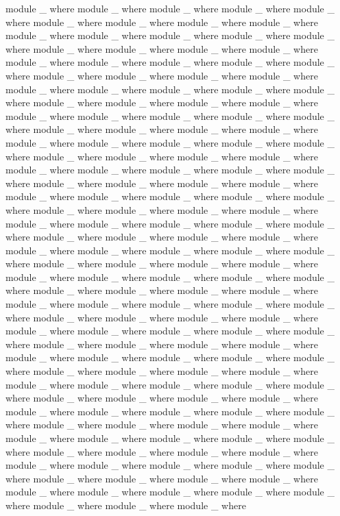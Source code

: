 \documentclass{article}
\begin{document}
\begin{code}
module _ where
module _ where
module _ where
module _ where
module _ where
module _ where
module _ where
module _ where
module _ where
module _ where
module _ where
module _ where
module _ where
module _ where
module _ where
module _ where
module _ where
module _ where
module _ where
module _ where
module _ where
module _ where
module _ where
module _ where
module _ where
module _ where
module _ where
module _ where
module _ where
module _ where
module _ where
module _ where
module _ where
module _ where
module _ where
module _ where
module _ where
module _ where
module _ where
module _ where
module _ where
module _ where
module _ where
module _ where
module _ where
module _ where
module _ where
module _ where
module _ where
module _ where
module _ where
module _ where
module _ where
module _ where
module _ where
module _ where
module _ where
module _ where
module _ where
module _ where
module _ where
module _ where
module _ where
module _ where
module _ where
module _ where
module _ where
module _ where
module _ where
module _ where
module _ where
module _ where
module _ where
module _ where
module _ where
module _ where
module _ where
module _ where
module _ where
module _ where
module _ where
module _ where
module _ where
module _ where
module _ where
module _ where
module _ where
module _ where
module _ where
module _ where
module _ where
module _ where
module _ where
module _ where
module _ where
module _ where
module _ where
module _ where
module _ where
module _ where
module _ where
module _ where
module _ where
module _ where
module _ where
module _ where
module _ where
module _ where
module _ where
module _ where
module _ where
module _ where
module _ where
module _ where
module _ where
module _ where
module _ where
module _ where
module _ where
module _ where
module _ where
module _ where
module _ where
module _ where
module _ where
module _ where
module _ where
module _ where
module _ where
module _ where
module _ where
module _ where
module _ where
module _ where
module _ where
module _ where
module _ where
module _ where
module _ where
module _ where
module _ where
module _ where
module _ where
module _ where
module _ where
module _ where
module _ where
module _ where
module _ where
module _ where
module _ where
module _ where
module _ where
module _ where
module _ where
module _ where
module _ where
module _ where
module _ where
module _ where
module _ where
module _ where
module _ where
module _ where
module _ where
module _ where
module _ where
module _ where
module _ where
module _ where

\end{code}
\end{document}
